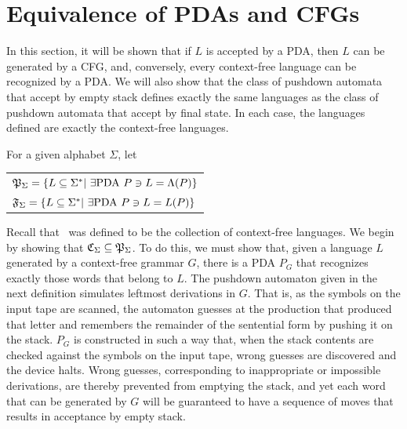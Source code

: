 \section{Equivalence of PDAs and CFGs}\label{sec-10.2}

In this section, it will be shown that if $L$ is accepted by a PDA, then $L$ can
be generated by a CFG, and, conversely, every context-free language can be
recognized by a PDA. We will also show that the class of pushdown automata that
accept by empty stack defines exactly the same languages as the class of
pushdown automata that accept by final state. In each case, the languages
defined are exactly the context-free languages.

\begin{dfn}\label{dfn-10.5}
For a given alphabet $\Sigma$, let
\begin{center}\begin{tabular}{l}
$\mathfrak{P}_\Sigma = \{L \subseteq \Sigma^*|\ \exists\text{PDA }P \ni L = \Lambda(P)\}$ \\
$\mathfrak{F}_\Sigma = \{L \subseteq \Sigma^*|\ \exists\text{PDA }P \ni L = L(P)\}$
\end{tabular}\end{center}
\end{dfn}

Recall that \CSIG\ was defined to be the collection of context-free languages. We
begin by showing that $\mathfrak{C}_\Sigma\subseteq\mathfrak{P}_\Sigma$. To do this, we must show that,
given a language $L$ generated by a context-free grammar $G$, there is a PDA
$P_G$ that recognizes exactly those words that belong to $L$. The pushdown
automaton given in the next definition simulates leftmost derivations in $G$.
That is, as the symbols on the input tape are scanned, the automaton guesses at
the production that produced that letter and remembers the remainder of the
sentential form by pushing it on the stack. $P_G$ is constructed in such a way
that, when the stack contents are checked against the symbols on the input tape,
wrong guesses are discovered and the device halts. Wrong guesses, corresponding
to inappropriate or impossible derivations, are thereby prevented from emptying
the stack, and yet each word that can be generated by $G$ will be guaranteed to
have a sequence of moves that results in acceptance by empty stack.

